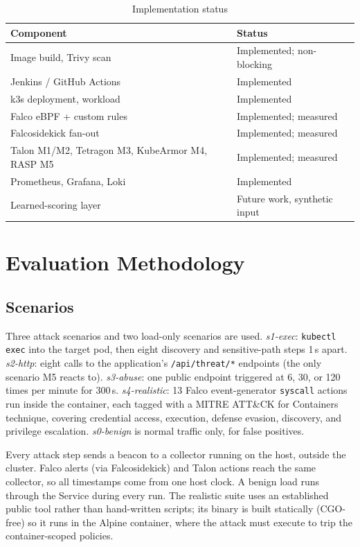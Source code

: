 \documentclass[10pt,conference]{IEEEtran}
\begin{document}
\begin{table}[t]
\caption{Implementation status}
\label{tab:impl}
\centering
\begin{tabular}{@{}p{}p{}@{}}
\toprule
Component & Status\\
\midrule
Image build, Trivy scan & Implemented; non-blocking\\
Jenkins / GitHub Actions & Implemented\\
k3s deployment, workload & Implemented\\
Falco eBPF + custom rules & Implemented; measured\\
Falcosidekick fan-out & Implemented; measured\\
Talon M1/M2, Tetragon M3, KubeArmor M4, RASP M5 & Implemented; measured\\
Prometheus, Grafana, Loki & Implemented\\
Learned-scoring layer & Future work, synthetic input\\
\bottomrule
\end{tabular}
\end{table}

\section{Evaluation Methodology}\label{sec:method}
\subsection{Scenarios}
Three attack scenarios and two load-only scenarios are used. \emph{s1-exec}: \texttt{kubectl exec} into the target pod, then eight discovery and sensitive-path steps 1\,s apart. \emph{s2-http}: eight calls to the application's \texttt{/api/threat/*} endpoints (the only scenario M5 reacts to). \emph{s3-abuse}: one public endpoint triggered at 6, 30, or 120 times per minute for 300\,s. \emph{s4-realistic}: 13 Falco event-generator \texttt{syscall} actions run inside the container, each tagged with a MITRE ATT\&CK for Containers technique, covering credential access, execution, defense evasion, discovery, and privilege escalation. \emph{s0-benign} is normal traffic only, for false positives.

Every attack step sends a beacon to a collector running on the host, outside the cluster. Falco alerts (via Falcosidekick) and Talon actions reach the same collector, so all timestamps come from one host clock. A benign load runs through the Service during every run. The realistic suite uses an established public tool rather than hand-written scripts; its binary is built statically (CGO-free) so it runs in the Alpine container, where the attack must execute to trip the container-scoped policies.
\end{document}
